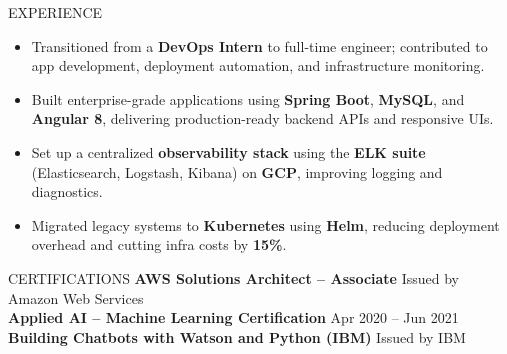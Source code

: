 \documentclass{resume} %
\begin{document}
\begin{rSection}{EXPERIENCE}
\begin{itemize}
\itemsep -3pt {}
    \item Transitioned from a \textbf{DevOps Intern} to full-time engineer; contributed to app development, deployment automation, and infrastructure monitoring.
    \item Built enterprise-grade applications using \textbf{Spring Boot}, \textbf{MySQL}, and \textbf{Angular 8}, delivering production-ready backend APIs and responsive UIs.
    \item Set up a centralized \textbf{observability stack} using the \textbf{ELK suite} (Elasticsearch, Logstash, Kibana) on \textbf{GCP}, improving logging and diagnostics.
    \item Migrated legacy systems to \textbf{Kubernetes} using \textbf{Helm}, reducing deployment overhead and cutting infra costs by \textbf{15\%}.
\end{itemize}



\end{rSection}



\vspace{-0.2em}
\begin{rSection}{CERTIFICATIONS}
\textbf{AWS Solutions Architect – Associate} \hfill Issued by Amazon Web Services \\
\textbf{Applied AI – Machine Learning Certification} \hfill Apr 2020 – Jun 2021 \\
\textbf{Building Chatbots with Watson and Python (IBM)} \hfill Issued by IBM \\

\end{rSection}





\end{document}
